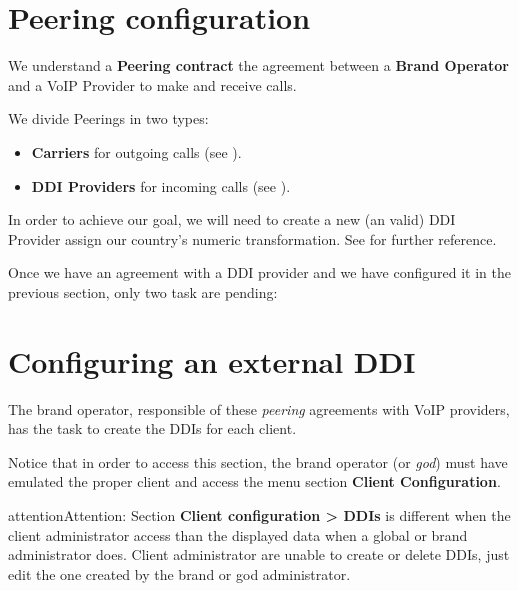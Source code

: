 \documentclass[letterpaper,10pt,english]{sphinxmanual}
\begin{document}
\section{Peering configuration}
\label{getting_started/external_incoming_calls/peering:peering-configuration}\label{getting_started/external_incoming_calls/peering::doc}
We understand a \textbf{Peering contract} the agreement between a \textbf{Brand Operator}
and a VoIP Provider to make and receive calls.

We divide Peerings in two types:
\begin{itemize}
\item {} 
\textbf{Carriers} for outgoing calls (see {\hyperref[administration_portal/brand/providers/carriers:carriers]{}}).

\item {} 
\textbf{DDI Providers} for incoming calls (see {\hyperref[administration_portal/brand/providers/ddi_providers:ddi\string-providers]{}}).

\end{itemize}

In order to achieve our goal, we will need to create a new (an valid) DDI Provider assign our country's
numeric transformation. See {\hyperref[administration_portal/brand/providers/ddi_providers:ddi\string-providers]{}} for further reference.

Once we have an agreement with a DDI provider and we have configured it in
the previous section, only two task are pending:


\section{Configuring an external DDI}
\label{getting_started/external_incoming_calls/configure_ddi:settingup-ddi}\label{getting_started/external_incoming_calls/configure_ddi:configuring-an-external-ddi}\label{getting_started/external_incoming_calls/configure_ddi::doc}
The brand operator, responsible of these \emph{peering} agreements with VoIP providers,
has the task to create the DDIs for each client.

Notice that in order to access this section, the brand operator (or \emph{god})
must have emulated the proper client and access the menu section \textbf{Client
Configuration}.

\begin{notice}{attention}{Attention:}
Section \textbf{Client configuration \textgreater{} DDIs} is different when the
client administrator access than the displayed data when a global or brand
administrator does. Client administrator are unable to create or delete
DDIs, just edit the one created by the brand or god administrator.
\end{notice}
\end{document}

